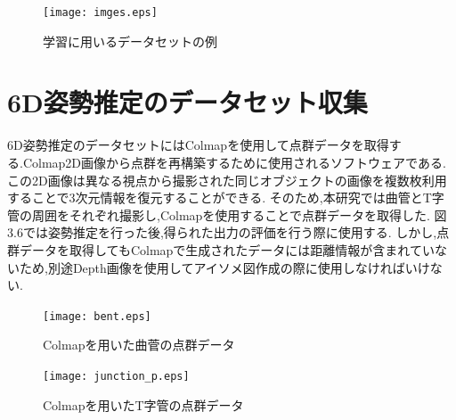 \begin{figure}[htbt]
	\centering
	 \texttt{[image: imges.eps]}
	 \caption{学習に用いるデータセットの例}
	 \label{fig:f2}
\end{figure}

\section{6D姿勢推定のデータセット収集}
6D姿勢推定のデータセットにはColmapを使用して点群データを取得する.Colmap2D画像から点群を再構築するために使用されるソフトウェアである.
この2D画像は異なる視点から撮影された同じオブジェクトの画像を複数枚利用することで3次元情報を復元することができる.
そのため,本研究では曲管とT字管の周囲をそれぞれ撮影し,Colmapを使用することで点群データを取得した.
図3.6では姿勢推定を行った後,得られた出力の評価を行う際に使用する.
しかし,点群データを取得してもColmapで生成されたデータには距離情報が含まれていないため,別途Depth画像を使用してアイソメ図作成の際に使用しなければいけない.
\begin{figure}[htbt]
	\centering
	 \texttt{[image: bent.eps]}
	 \caption{Colmapを用いた曲菅の点群データ}
	 \label{fig:f2}
\end{figure}

\begin{figure}[htbt]
	\centering
	 \texttt{[image: junction\_p.eps]}
	 \caption{Colmapを用いたT字管の点群データ}
	 \label{fig:f2}
\end{figure}

\clearpage
